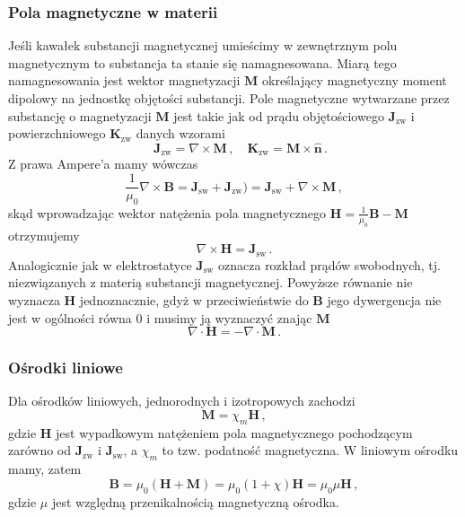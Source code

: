 \documentclass[../main.tex]{subfiles}
\begin{document}
\subsubsection{Pola magnetyczne w materii}
Jeśli kawałek substancji magnetycznej umieścimy w zewnętrznym polu magnetycznym to substancja ta
stanie się namagnesowana. Miarą tego namagnesowania jest wektor magnetyzacji \(\mathbf{M}\)
określający magnetyczny moment dipolowy na jednostkę objętości substancji. Pole magnetyczne
wytwarzane przez substancję o magnetyzacji \(\mathbf{M}\) jest takie jak od prądu objętościowego
\(\mathbf{J}_\text{zw}\) i powierzchniowego \(\mathbf{K}_\text{zw}\) danych wzorami
\begin{equation*}
  \quad\mathbf{J}_\text{zw}=\nabla\times\mathbf{M}\,,\quad\mathbf{K}_\text{zw}=\mathbf{M}\times\mathbf{\hat{n}}\,.
\end{equation*}
Z prawa Ampere'a mamy wówczas
\begin{equation*}
    \frac{1}{\mu_0}\nabla\times\mathbf{B}=\mathbf{J}_\text{sw}+\mathbf{J}_\text{zw})=\mathbf{J}_\text{sw}+\nabla\times\mathbf{M}\,,
\end{equation*}
skąd wprowadzając wektor natężenia pola magnetycznego
\(\mathbf{H}=\frac{1}{\mu_0}\mathbf{B}-\mathbf{M}\) otrzymujemy
\begin{equation*}
    \nabla\times\mathbf{H}=\mathbf{J}_\text{sw}\,.
\end{equation*}
Analogicznie jak w elektrostatyce \(\mathbf{J}_\text{sw}\) oznacza rozkład prądów swobodnych, tj.
niezwiązanych z materią substancji magnetycznej. Powyższe równanie nie wyznacza \(\mathbf{H}\)
jednoznacznie, gdyż w przeciwieństwie do \(\mathbf{B}\) jego dywergencja nie jest w ogólności równa
0 i musimy ją wyznaczyć znając \(\mathbf{M}\)
\begin{equation*}
    \nabla\cdot\mathbf{H}=-\nabla\cdot\mathbf{M}\,.
\end{equation*}
\subsubsection*{Ośrodki liniowe}
Dla ośrodków liniowych, jednorodnych i izotropowych zachodzi
\begin{equation*}
    \mathbf{M}=\chi_m\mathbf{H}\,,
\end{equation*}
gdzie \(\mathbf{H}\) jest wypadkowym natężeniem pola magnetycznego pochodzącym zarówno od
\(\mathbf{J}_\text{zw}\) i \(\mathbf{J}_\text{sw}\), a \(\chi_m\) to tzw. podatność magnetyczna. W
liniowym ośrodku mamy, zatem
\begin{equation*}
    \mathbf{B}=\mu_0(\mathbf{H}+\mathbf{M})=\mu_0(1+\chi)\mathbf{H}=\mu_0\mu\mathbf{H}\,,
\end{equation*}
gdzie \(\mu\) jest względną przenikalnością magnetyczną ośrodka.
\end{document}
